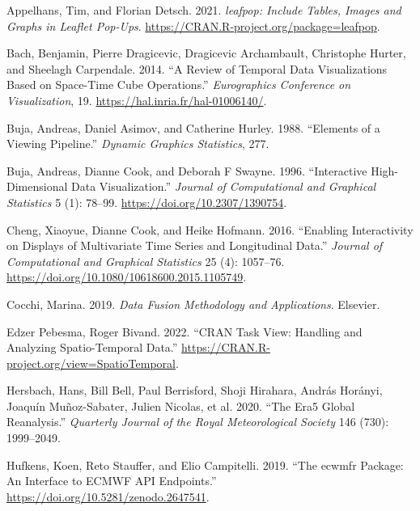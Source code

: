 \documentclass{article}
\newlength{\cslhangindent}
\newlength{\cslentryspacingunit} %
\newenvironment{CSLReferences}[2] %
 {%
  \setlength{\parindent}{0pt}
  \ifodd #1
  \let\oldpar\par
  \def\par{\hangindent=\cslhangindent\oldpar}
  \fi
  \setlength{\parskip}{#2\cslentryspacingunit}
 }%
 {}
\begin{document}
\hypertarget{refs}{}
\begin{CSLReferences}{1}{0}
\leavevmode\hypertarget{ref-leafpop}{}%
Appelhans, Tim, and Florian Detsch. 2021. \emph{{leafpop}: Include Tables, Images and Graphs in Leaflet Pop-Ups}. \url{https://CRAN.R-project.org/package=leafpop}.

\leavevmode\hypertarget{ref-bach_review_2014}{}%
Bach, Benjamin, Pierre Dragicevic, Dragicevic Archambault, Christophe Hurter, and Sheelagh Carpendale. 2014. {``A {Review} of {Temporal} {Data} {Visualizations} {Based} on {Space}-{Time} {Cube} {Operations}.''} \emph{Eurographics Conference on Visualization}, 19. \url{https://hal.inria.fr/hal-01006140/}.

\leavevmode\hypertarget{ref-buja1988elements}{}%
Buja, Andreas, Daniel Asimov, and Catherine Hurley. 1988. {``Elements of a Viewing Pipeline.''} \emph{Dynamic Graphics Statistics}, 277.

\leavevmode\hypertarget{ref-buja1996interactive}{}%
Buja, Andreas, Dianne Cook, and Deborah F Swayne. 1996. {``Interactive High-Dimensional Data Visualization.''} \emph{Journal of Computational and Graphical Statistics} 5 (1): 78--99. \url{https://doi.org/10.2307/1390754}.

\leavevmode\hypertarget{ref-cheng2016enabling}{}%
Cheng, Xiaoyue, Dianne Cook, and Heike Hofmann. 2016. {``Enabling Interactivity on Displays of Multivariate Time Series and Longitudinal Data.''} \emph{Journal of Computational and Graphical Statistics} 25 (4): 1057--76. \url{https://doi.org/10.1080/10618600.2015.1105749}.

\leavevmode\hypertarget{ref-cocchi2019data}{}%
Cocchi, Marina. 2019. \emph{Data Fusion Methodology and Applications}. Elsevier.

\leavevmode\hypertarget{ref-ctvspatiotemporal}{}%
Edzer Pebesma, Roger Bivand. 2022. {``{CRAN} Task View: Handling and Analyzing Spatio-Temporal Data.''} \url{https://CRAN.R-project.org/view=SpatioTemporal}.

\leavevmode\hypertarget{ref-hersbach2020era5}{}%
Hersbach, Hans, Bill Bell, Paul Berrisford, Shoji Hirahara, András Horányi, Joaquín Muñoz-Sabater, Julien Nicolas, et al. 2020. {``The Era5 Global Reanalysis.''} \emph{Quarterly Journal of the Royal Meteorological Society} 146 (730): 1999--2049.

\leavevmode\hypertarget{ref-ecwmfr}{}%
Hufkens, Koen, Reto Stauffer, and Elio Campitelli. 2019. {``The {ecwmfr} Package: An Interface to ECMWF API Endpoints.''} \url{https://doi.org/10.5281/zenodo.2647541}.


\end{CSLReferences}
\end{document}

